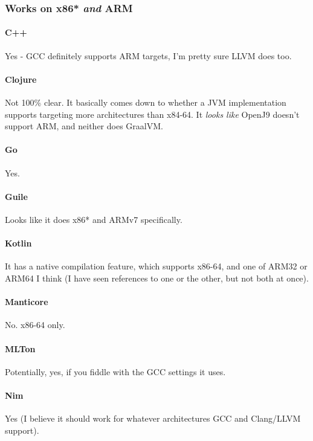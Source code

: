 \subsubsection{Works on x86* \emph{and} ARM}

\paragraph{C++}
Yes - GCC definitely supports ARM targets, I'm pretty sure LLVM does too.

\paragraph{Clojure}
Not 100\% clear.  It basically comes down to whether a JVM implementation supports targeting more architectures than x84-64.  It \emph{looks like} OpenJ9 doesn't support ARM, and neither does GraalVM.

\paragraph{Go}
Yes.

\paragraph{Guile}
Looks like it does x86* and ARMv7 specifically.

\paragraph{Kotlin}
It has a native compilation feature, which supports x86-64, and one of ARM32 or ARM64 I think (I have seen references to one or the other, but not both at once).

\paragraph{Manticore}
No.  x86-64 only.

\paragraph{MLTon}
Potentially, yes, if you fiddle with the GCC settings it uses.

\paragraph{Nim}
Yes (I believe it should work for whatever architectures GCC and Clang/LLVM support).

